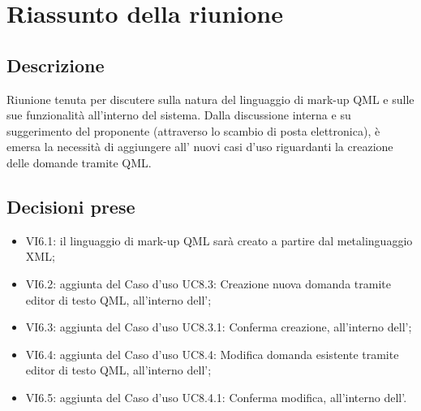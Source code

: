 \section{Riassunto della riunione}
\subsection{Descrizione}

Riunione tenuta per discutere sulla natura del linguaggio di mark-up QML e sulle sue funzionalità all'interno del sistema.
Dalla discussione interna e su suggerimento del proponente (attraverso lo scambio di posta elettronica), è emersa la necessità di aggiungere all'\AdR {} nuovi casi d'uso riguardanti la creazione delle domande tramite QML.

\subsection{Decisioni prese}
\begin{itemize}
\item VI6.1: il linguaggio di mark-up QML sarà creato a partire dal metalinguaggio XML;
\item VI6.2: aggiunta del Caso d'uso UC8.3: Creazione nuova domanda tramite editor di testo QML, all'interno dell'\AdR;
\item VI6.3: aggiunta del Caso d'uso UC8.3.1: Conferma creazione, all'interno dell'\AdR;
\item VI6.4: aggiunta del Caso d'uso UC8.4: Modifica domanda esistente tramite editor di testo QML, all'interno dell'\AdR;
\item VI6.5: aggiunta del Caso d'uso UC8.4.1: Conferma modifica, all'interno dell'\AdR.
\end{itemize}

